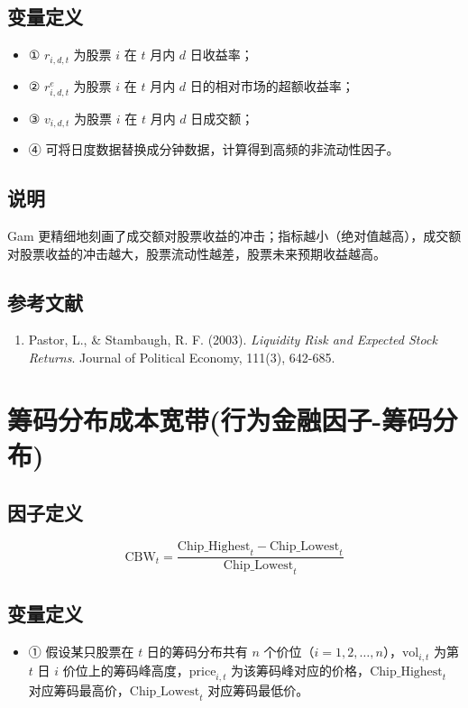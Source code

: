\documentclass{article}
\begin{document}
\subsection{变量定义}
\begin{itemize}
    \item ① \( r_{i,d,t} \) 为股票 \( i \) 在 \( t \) 月内 \( d \) 日收益率；
    \item ② \( r_{i,d,t}^e \) 为股票 \( i \) 在 \( t \) 月内 \( d \) 日的相对市场的超额收益率；
    \item ③ \( v_{i,d,t} \) 为股票 \( i \) 在 \( t \) 月内 \( d \) 日成交额；
    \item ④ 可将日度数据替换成分钟数据，计算得到高频的非流动性因子。
\end{itemize}

\subsection{说明}
Gam 更精细地刻画了成交额对股票收益的冲击；指标越小（绝对值越高），成交额对股票收益的冲击越大，股票流动性越差，股票未来预期收益越高。

\subsection{参考文献}
\begin{enumerate}
    \item Pastor, L., \& Stambaugh, R. F. (2003). \textit{Liquidity Risk and Expected Stock Returns}. Journal of Political Economy, 111(3), 642-685.
\end{enumerate}

\section{筹码分布成本宽带(行为金融因子-筹码分布)}

\subsection{因子定义}

\begin{equation}
    \mathrm{CBW}_t = \frac{\mathrm{Chip\_Highest}_t - \mathrm{Chip\_Lowest}_t}{\mathrm{Chip\_Lowest}_t}
\end{equation}

\subsection{变量定义}
\begin{itemize}
    \item ① 假设某只股票在 \( t \) 日的筹码分布共有 \( n \) 个价位（\( i=1,2,\ldots,n \)），\( \mathrm{vol}_{i,t} \) 为第 \( t \) 日 \( i \) 价位上的筹码峰高度，\( \mathrm{price}_{i,t} \) 为该筹码峰对应的价格，\( \mathrm{Chip\_Highest}_t \) 对应筹码最高价，\( \mathrm{Chip\_Lowest}_t \) 对应筹码最低价。
\end{itemize}
\end{document}
